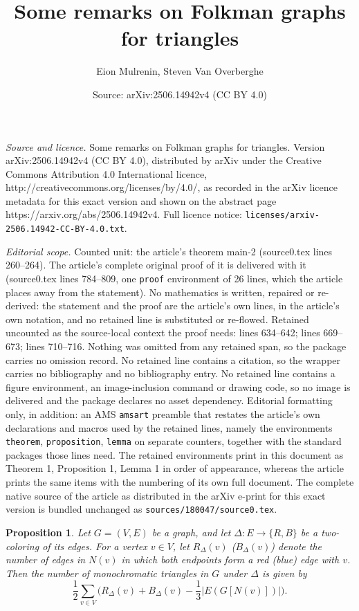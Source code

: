 \documentclass[10pt,a4paper]{amsart}
\title{Some remarks on Folkman graphs for triangles}
\author{Eion Mulrenin, Steven Van Overberghe}
\date{Source: arXiv:2506.14942v4 (CC BY 4.0)}
\newtheorem{proposition}{Proposition}
\begin{document}
\maketitle

\noindent\emph{Source and licence.} Some remarks on Folkman graphs for triangles. Version arXiv:2506.14942v4 (CC BY 4.0), distributed by arXiv under the Creative Commons Attribution 4.0 International licence, http://creativecommons.org/licenses/by/4.0/, as recorded in the arXiv licence metadata for this exact version and shown on the abstract page https://arxiv.org/abs/2506.14942v4. Full licence notice: \texttt{licenses/arxiv-2506.14942-CC-BY-4.0.txt}.\par\smallskip

\noindent\textit{Editorial scope.} Counted unit: the article's theorem main-2 (source0.tex lines 260--264). The article's complete original proof of it is delivered with it (source0.tex lines 784--809, one \texttt{proof} environment of 26 lines, which the article places away from the statement). No mathematics is written, repaired or re-derived: the statement and the proof are the article's own lines, in the article's own notation, and no retained line is substituted or re-flowed.  Retained uncounted as the source-local context the proof needs: lines 634--642; lines 669--673; lines 710--716.  Nothing was omitted from any retained span, so the package carries no omission record.  No retained line contains a citation, so the wrapper carries no bibliography and no bibliography entry.  No retained line contains a figure environment, an image-inclusion command or drawing code, so no image is delivered and the package declares no asset dependency.  Editorial formatting only, in addition: an AMS \texttt{amsart} preamble that restates the article's own declarations and macros used by the retained lines, namely the environments \texttt{theorem}, \texttt{proposition}, \texttt{lemma} on separate counters, together with the standard packages those lines need.  The retained environments print in this document as Theorem 1, Proposition 1, Lemma 1 in order of appearance, whereas the article prints the same items with the numbering of its own full document.  The complete native source of the article as distributed in the arXiv e-print for this exact version is bundled unchanged as \texttt{sources/180047/source0.tex}.
\begin{proposition}
\label{prp: goodman}
    Let $G = (V,E)$ be a graph, and let $\Delta: E \to \{R,B\}$ be a two-coloring of its edges.
    For a vertex $v \in V$, let $R_{\Delta}(v)$ ($B_\Delta(v)$) denote the number of edges in $N(v)$ in which both endpoints form a red (blue) edge with $v$.
    Then the number of monochromatic triangles in $G$ under $\Delta$ is given by
    \begin{equation*}
        \frac{1}{2} \sum_{v \in V} {\Big (} R_\Delta(v) + B_\Delta(v) - \frac{1}{3}|E(G[N(v)])| {\Big )}.
    \end{equation*}
\end{proposition}
\end{document}
